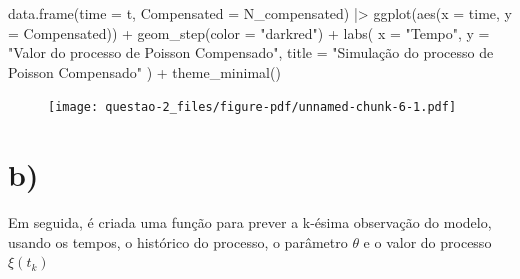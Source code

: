 \documentclass[
  letterpaper,
  DIV=11,
  numbers=noendperiod]{scrreprt}
\newenvironment{Shaded}{\begin{snugshade}}{\end{snugshade}}
\newcommand{\AttributeTok}[1]{\textcolor[rgb]{0.40,0.45,0.13}{#1}}
\newcommand{\FunctionTok}[1]{\textcolor[rgb]{0.28,0.35,0.67}{#1}}
\newcommand{\NormalTok}[1]{\textcolor[rgb]{0.00,0.23,0.31}{#1}}
\newcommand{\SpecialCharTok}[1]{\textcolor[rgb]{0.37,0.37,0.37}{#1}}
\newcommand{\StringTok}[1]{\textcolor[rgb]{0.13,0.47,0.30}{#1}}
\begin{document}
\begin{Shaded}
\begin{Highlighting}[]
\FunctionTok{data.frame}\NormalTok{(}\AttributeTok{time =}\NormalTok{ t, }\AttributeTok{Compensated =}\NormalTok{ N\_compensated) }\SpecialCharTok{|\textgreater{}} 
    \FunctionTok{ggplot}\NormalTok{(}\FunctionTok{aes}\NormalTok{(}\AttributeTok{x =}\NormalTok{ time, }\AttributeTok{y =}\NormalTok{ Compensated)) }\SpecialCharTok{+}
    \FunctionTok{geom\_step}\NormalTok{(}\AttributeTok{color =} \StringTok{"darkred"}\NormalTok{) }\SpecialCharTok{+}
    \FunctionTok{labs}\NormalTok{(}
        \AttributeTok{x =} \StringTok{"Tempo"}\NormalTok{,}
        \AttributeTok{y =} \StringTok{"Valor do processo de Poisson Compensado"}\NormalTok{,}
        \AttributeTok{title =} \StringTok{"Simulação do processo de Poisson Compensado"}
\NormalTok{    ) }\SpecialCharTok{+}
    \FunctionTok{theme\_minimal}\NormalTok{()}
\end{Highlighting}
\end{Shaded}

\begin{figure}[H]

{\centering \texttt{[image: questao-2\_files/figure-pdf/unnamed-chunk-6-1.pdf]}

}

\end{figure}

\hypertarget{b-1}{%
\section*{b)}\label{b-1}}


Em seguida, é criada uma função para prever a k-ésima observação do
modelo, usando os tempos, o histórico do processo, o parâmetro
\(\theta\) e o valor do processo \(\xi(t_{k})\)
\end{document}
